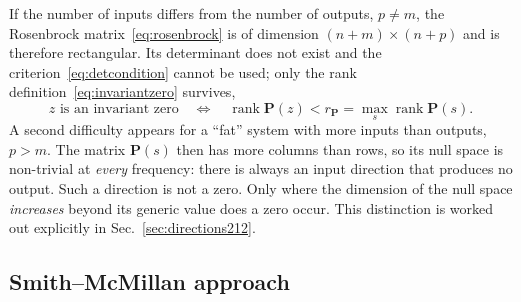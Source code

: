 If the number of inputs differs from the number of outputs, $p\neq m$, the Rosenbrock
matrix~\eqref{eq:rosenbrock} is of dimension $(n+m)\times(n+p)$ and is therefore rectangular. Its
determinant does not exist and the criterion~\eqref{eq:detcondition} cannot be used; only the
rank definition~\eqref{eq:invariantzero} survives,
\begin{equation}
    z \text{ is an invariant zero}
    \quad\Longleftrightarrow\quad
    \operatorname{rank}\mathbf{P}(z) < r_{\mathbf{P}} = \max_{s}\operatorname{rank}\mathbf{P}(s).
    \label{eq:ranktest}
\end{equation}
A second difficulty appears for a ``fat'' system with more inputs than outputs, $p>m$. The
matrix $\mathbf{P}(s)$ then has more columns than rows, so its null space is non-trivial at
\emph{every} frequency: there is always an input direction that produces no output. Such a
direction is not a zero. Only where the dimension of the null space \emph{increases} beyond its
generic value does a zero occur. This distinction is worked out explicitly in
Sec.~\ref{sec:directions212}.

\subsection{Smith--McMillan approach}

